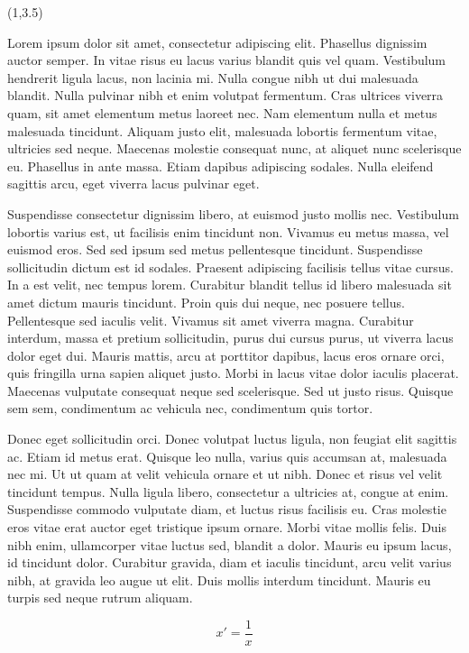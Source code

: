 \documentclass[a0,landscape]{a0poster}
\newcommand{\headingcolor}{\color{BannerThreeColor}}
\def\LHead#1{\noindent{\LARGE \headingcolor #1}\smallskip}
\begin{document}
\begin{textblock}{7}(1,3.5)
  \LHead{Introduction}
  
  Lorem ipsum dolor sit amet, consectetur adipiscing elit. Phasellus dignissim auctor semper. In vitae risus eu lacus varius blandit quis vel quam. Vestibulum hendrerit ligula lacus, non lacinia mi. Nulla congue nibh ut dui malesuada blandit. Nulla pulvinar nibh et enim volutpat fermentum. Cras ultrices viverra quam, sit amet elementum metus laoreet nec. Nam elementum nulla et metus malesuada tincidunt. Aliquam justo elit, malesuada lobortis fermentum vitae, ultricies sed neque. Maecenas molestie consequat nunc, at aliquet nunc scelerisque eu. Phasellus in ante massa. Etiam dapibus adipiscing sodales. Nulla eleifend sagittis arcu, eget viverra lacus pulvinar eget. 

 Suspendisse consectetur dignissim libero, at euismod justo mollis nec. Vestibulum lobortis varius est, ut facilisis enim tincidunt non. Vivamus eu metus massa, vel euismod eros. Sed sed ipsum sed metus pellentesque tincidunt. Suspendisse sollicitudin dictum est id sodales. Praesent adipiscing facilisis tellus vitae cursus. In a est velit, nec tempus lorem. Curabitur blandit tellus id libero malesuada sit amet dictum mauris tincidunt. Proin quis dui neque, nec posuere tellus. Pellentesque sed iaculis velit. Vivamus sit amet viverra magna. Curabitur interdum, massa et pretium sollicitudin, purus dui cursus purus, ut viverra lacus dolor eget dui. Mauris mattis, arcu at porttitor dapibus, lacus eros ornare orci, quis fringilla urna sapien aliquet justo. Morbi in lacus vitae dolor iaculis placerat. Maecenas vulputate consequat neque sed scelerisque. Sed ut justo risus. Quisque sem sem, condimentum ac vehicula nec, condimentum quis tortor. 

 Donec eget sollicitudin orci. Donec volutpat luctus ligula, non feugiat elit sagittis ac. Etiam id metus erat. Quisque leo nulla, varius quis accumsan at, malesuada nec mi. Ut ut quam at velit vehicula ornare et ut nibh. Donec et risus vel velit tincidunt tempus. Nulla ligula libero, consectetur a ultricies at, congue at enim. Suspendisse commodo vulputate diam, et luctus risus facilisis eu. Cras molestie eros vitae erat auctor eget tristique ipsum ornare. Morbi vitae mollis felis. Duis nibh enim, ullamcorper vitae luctus sed, blandit a dolor. Mauris eu ipsum lacus, id tincidunt dolor. Curabitur gravida, diam et iaculis tincidunt, arcu velit varius nibh, at gravida leo augue ut elit. Duis mollis interdum tincidunt. Mauris eu turpis sed neque rutrum aliquam. 

  \[
  x' = \frac{1}{x}
  \]

\end{textblock}
\end{document}
